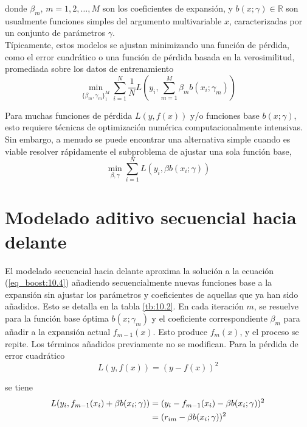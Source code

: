 \noindent donde $\beta_m$, $m = 1,2,\dots,M$ son los coeficientes de expansión, y $b(x; \gamma) \in \mathbb{R}$ son usualmente funciones simples del argumento multivariable $x$, caracterizadas por un conjunto de parámetros $\gamma$. \\

Típicamente, estos modelos se ajustan minimizando una función de pérdida, como el error cuadrático o una función de pérdida basada en la verosimilitud, promediada sobre los datos de entrenamiento
\begin{equation}
\min_{\{\beta_m ,\gamma_m\}_1^M} \sum_{i=1}^{N} \frac{1}{N} L \left(y_i, \sum_{m=1}^{M} \beta_m b(x_i; \gamma_m)\right)
\label{eq_boost:10.4}
\end{equation}

Para muchas funciones de pérdida $L(y,f(x))$ y/o funciones base $b(x; \gamma)$, esto requiere técnicas de optimización numérica computacionalmente intensivas. Sin embargo, a menudo se puede encontrar una alternativa simple cuando es viable resolver rápidamente el subproblema de ajustar una sola función base,
\begin{equation}
\min_{\beta,\gamma} \sum_{i=1}^{N} L(y_i, \beta b(x_i; \gamma))
\end{equation}

\section{Modelado aditivo secuencial hacia delante}

El modelado secuencial hacia delante aproxima la solución a la ecuación (\ref{eq_boost:10.4}) añadiendo secuencialmente nuevas funciones base a la expansión sin ajustar los parámetros y coeficientes de aquellas que ya han sido añadidos. Esto se detalla en la tabla \ref{tb:10.2}. En cada iteración $m$, se resuelve para la función base óptima $b(x; \gamma_m)$ y el coeficiente correspondiente $\beta_m$ para añadir a la expansión actual $f_{m-1}(x)$. Esto produce $f_m(x)$, y el proceso se repite. Los términos añadidos previamente no se modifican. Para la pérdida de error cuadrático
\begin{equation}
L(y, f(x)) = (y - f(x))^2
\end{equation}

\noindent se tiene
\begin{align}
L(y_i, f_{m-1}(x_i) + \beta b(x_i; \gamma)) &= (y_i - f_{m-1}(x_i) - \beta b(x_i; \gamma))^2 \notag \\
& = (r_{im} - \beta b(x_i; \gamma))^2
\end{align}

